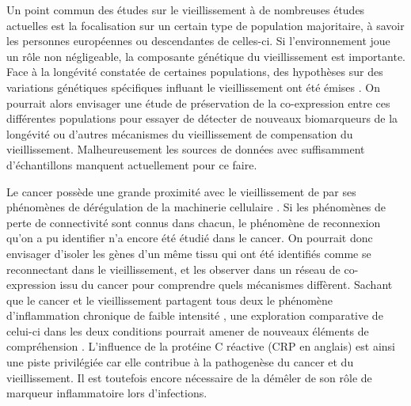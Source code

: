 Un point commun des études sur le vieillissement à de nombreuses études actuelles est la focalisation sur un certain type de population majoritaire, à savoir les personnes européennes ou descendantes de celles-ci. Si l'environnement joue un rôle non négligeable, la composante génétique du vieillissement est importante. Face à la longévité constatée de certaines populations, des hypothèses sur des variations génétiques spécifiques influant le vieillissement ont été émises \cite{Deelen2019Aug}. On pourrait alors envisager une étude de préservation de la co-expression entre ces différentes populations pour essayer de détecter de nouveaux biomarqueurs de la longévité ou d'autres mécanismes du vieillissement de compensation du vieillissement. Malheureusement les sources de données avec suffisamment d'échantillons manquent actuellement pour ce faire.

Le cancer possède une grande proximité avec le vieillissement de par ses phénomènes de dérégulation de la machinerie cellulaire \cite{Aunan2017}. Si les phénomènes de perte de connectivité sont connus dans chacun, le phénomène de reconnexion qu'on a pu identifier n'a encore été étudié dans le cancer. On pourrait donc envisager d'isoler les gènes d'un même tissu qui ont été identifiés comme se reconnectant dans le vieillissement, et les observer dans un réseau de co-expression issu du cancer pour comprendre quels mécanismes diffèrent. Sachant que le cancer et le vieillissement partagent tous deux le phénomène d'inflammation chronique de faible intensité \cite{Moreira-Pais2021Jul}, une exploration comparative de celui-ci dans les deux conditions pourrait amener de nouveaux éléments de compréhension \cite{Anglani2014}. L'influence de la protéine C réactive (CRP en anglais) est ainsi une piste privilégiée car elle contribue à la pathogenèse du cancer et du vieillissement. Il est toutefois encore nécessaire de la démêler de son rôle de marqueur inflammatoire lors d'infections.

